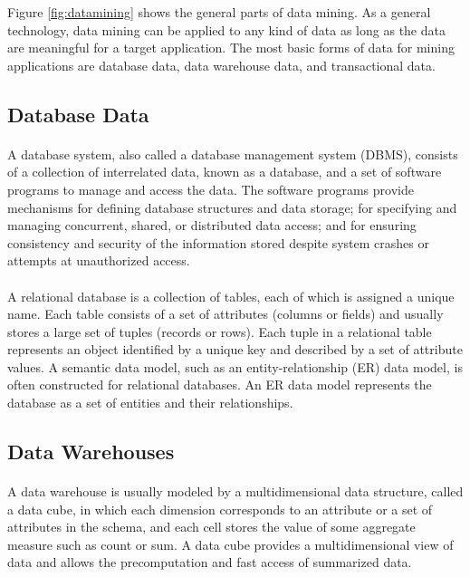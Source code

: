 Figure \ref{fig:datamining} shows the general parts of data mining.
As a general technology, data mining can be applied to any kind of data as long as the data are meaningful for a
target application. The most basic forms of data for mining applications are database data, data warehouse data, and transactional data.
\subsection{Database Data}
\paragraph{}
A database system, also called a database management system (DBMS), consists of a collection of
interrelated data, known as a database, and a set of software programs to manage and access the data. The
software programs provide mechanisms for defining database structures and data storage; for specifying and
managing concurrent, shared, or distributed data access; and for ensuring consistency and security of the
information stored despite system crashes or attempts at unauthorized access.
\paragraph{}
A relational database is a collection of tables, each of which is assigned a unique name. Each table consists of
a set of attributes (columns or fields) and usually stores a large set of tuples (records or rows). Each tuple in a
relational table represents an object identified by a unique key and described by a set of attribute values. A
semantic data model, such as an entity-relationship (ER) data model, is often constructed for relational
databases. An ER data model represents the database as a set of entities and their relationships.

\subsection{Data Warehouses}
\paragraph{}
A data warehouse is usually modeled by a multidimensional data structure, called a data cube, in which each
dimension corresponds to an attribute or a set of attributes in the schema, and each cell stores the value of
some aggregate measure such as count or sum. A data cube provides a multidimensional view of
data and allows the precomputation and fast access of summarized data.


